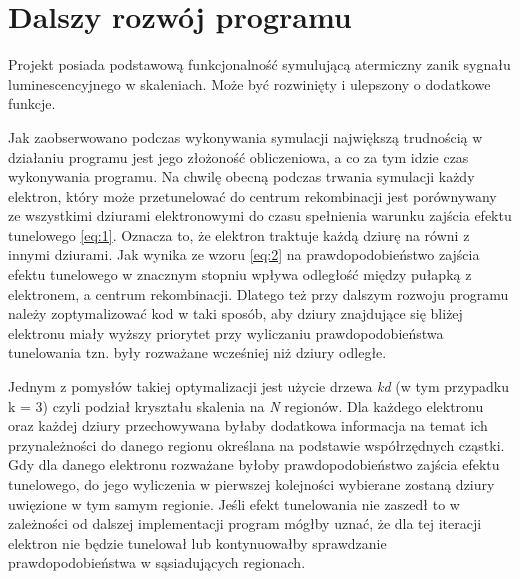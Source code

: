 \chapter{Dalszy rozwój programu}
Projekt posiada podstawową funkcjonalność symulującą atermiczny zanik sygnału luminescencyjnego w skaleniach. Może być rozwinięty i ulepszony o dodatkowe funkcje.

Jak zaobserwowano podczas wykonywania symulacji największą trudnością w działaniu programu jest jego złożoność obliczeniowa, a co za tym idzie czas wykonywania programu. Na chwilę obecną podczas trwania symulacji każdy elektron, który może przetunelować do centrum rekombinacji jest porównywany ze wszystkimi dziurami elektronowymi do czasu spełnienia warunku zajścia efektu tunelowego \ref{eq:1}. Oznacza to, że elektron traktuje każdą dziurę na równi z innymi dziurami. Jak wynika ze wzoru \ref{eq:2} na prawdopodobieństwo zajścia efektu tunelowego w znacznym stopniu wpływa odległość między pułapką z elektronem, a centrum rekombinacji. Dlatego też przy dalszym rozwoju programu należy zoptymalizować kod w taki sposób, aby dziury znajdujące się bliżej elektronu miały wyższy priorytet przy wyliczaniu prawdopodobieństwa tunelowania tzn. były rozważane wcześniej niż dziury odległe. 

Jednym z pomysłów takiej optymalizacji jest użycie drzewa \emph{kd} (w tym przypadku k = 3) czyli podział kryształu skalenia na \emph{N} regionów. Dla każdego elektronu oraz każdej dziury przechowywana byłaby dodatkowa informacja na temat ich przynależności do danego regionu określana na podstawie współrzędnych cząstki. Gdy dla danego elektronu rozważane byłoby prawdopodobieństwo zajścia efektu tunelowego, do jego wyliczenia w pierwszej kolejności wybierane zostaną dziury uwięzione w tym samym regionie. Jeśli efekt tunelowania nie zaszedł to w zależności od dalszej implementacji program mógłby uznać, że dla tej iteracji elektron nie będzie tunelował lub kontynuowałby sprawdzanie prawdopodobieństwa w sąsiadujących regionach.

